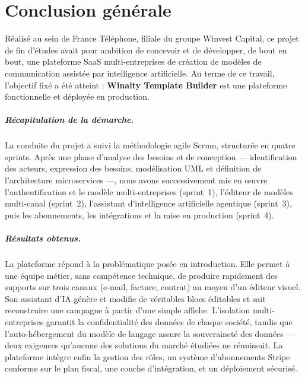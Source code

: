 \documentclass[12pt,a4paper,oneside]{report}
\begin{document}
\chapter*{Conclusion générale}

Réalisé au sein de France Téléphone, filiale du groupe Winvest Capital, ce
projet de fin d'études avait pour ambition de concevoir et de développer,
de bout en bout, une plateforme SaaS multi-entreprises de création de
modèles de communication assistée par intelligence artificielle. Au terme
de ce travail, l'objectif fixé a été atteint : \textbf{Winaity Template
Builder} est une plateforme fonctionnelle et déployée en production.

\paragraph{Récapitulation de la démarche.}
La conduite du projet a suivi la méthodologie agile Scrum, structurée en
quatre sprints. Après une phase d'analyse des besoins et de conception —
identification des acteurs, expression des besoins, modélisation UML et
définition de l'architecture microservices —, nous avons successivement mis
en \oe{}uvre l'authentification et le modèle multi-entreprises (sprint~1),
l'éditeur de modèles multi-canal (sprint~2), l'assistant d'intelligence
artificielle agentique (sprint~3), puis les abonnements, les intégrations et
la mise en production (sprint~4).

\paragraph{Résultats obtenus.}
La plateforme répond à la problématique posée en introduction. Elle permet à
une équipe métier, sans compétence technique, de produire rapidement des
supports sur trois canaux (e-mail, facture, contrat) au moyen d'un
éditeur visuel. Son assistant d'IA génère et modifie de véritables blocs
éditables et sait reconstruire une campagne à partir d'une simple affiche.
L'isolation multi-entreprises garantit la confidentialité des données de
chaque société, tandis que l'auto-hébergement du modèle de langage assure la
souveraineté des données — deux exigences qu'aucune des solutions du marché
étudiées ne réunissait. La plateforme intègre enfin la gestion des rôles, un
système d'abonnements Stripe conforme sur le plan fiscal, une couche
d'intégration, et un déploiement sécurisé.
\end{document}
